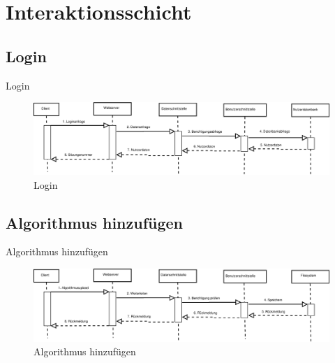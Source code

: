 \documentclass{beamer}
\begin{document}
		\section[Interaktion]{Interaktionsschicht}
		\subsection{Login}
		\begin{frame}{Login}	
			\begin{figure}
				\centering
				\includegraphics[width=\linewidth]{Grafik/Diagramm/Szenarios/Login}
				\caption{Login}
				\label{fig:Login}
			\end{figure}
		\end{frame}
		
		\subsection{Algorithmus hinzufügen}
		\begin{frame}{Algorithmus hinzufügen}	
			\begin{figure}
				\centering
				\includegraphics[width=\linewidth]{Grafik/Diagramm/Szenarios/Algorithmus}
				\caption{Algorithmus hinzufügen}
				\label{fig:Algorithmus}
			\end{figure}
		\end{frame}
		
\end{document}
